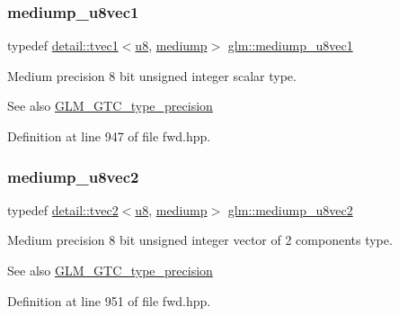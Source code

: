 \subsubsection{\texorpdfstring{mediump\+\_\+u8vec1}{mediump\_u8vec1}}
{\footnotesize\ttfamily typedef \hyperlink{structglm_1_1detail_1_1tvec1}{detail\+::tvec1}$<$\hyperlink{group__gtc__type__precision_ga5e3dc67373d5068997d2d9f41c9024d2}{u8}, \hyperlink{namespaceglm_a0f04f086094c747d227af4425893f545a6416f3ea0c9025fb21ed50c4d6620482}{mediump}$>$ \hyperlink{group__gtc__type__precision_gadefca284b7a5980fb6be735abb77395e}{glm\+::mediump\+\_\+u8vec1}}

Medium precision 8 bit unsigned integer scalar type. \begin{DoxySeeAlso}{See also}
\hyperlink{group__gtc__type__precision}{G\+L\+M\+\_\+\+G\+T\+C\+\_\+type\+\_\+precision} 
\end{DoxySeeAlso}


Definition at line 947 of file fwd.\+hpp.

\mbox{\label{group__gtc__type__precision_ga5e20c1315bc1fecc867bc74525bea2ab}} 
\subsubsection{\texorpdfstring{mediump\+\_\+u8vec2}{mediump\_u8vec2}}
{\footnotesize\ttfamily typedef \hyperlink{structglm_1_1detail_1_1tvec2}{detail\+::tvec2}$<$\hyperlink{group__gtc__type__precision_ga5e3dc67373d5068997d2d9f41c9024d2}{u8}, \hyperlink{namespaceglm_a0f04f086094c747d227af4425893f545a6416f3ea0c9025fb21ed50c4d6620482}{mediump}$>$ \hyperlink{group__gtc__type__precision_ga5e20c1315bc1fecc867bc74525bea2ab}{glm\+::mediump\+\_\+u8vec2}}

Medium precision 8 bit unsigned integer vector of 2 components type. \begin{DoxySeeAlso}{See also}
\hyperlink{group__gtc__type__precision}{G\+L\+M\+\_\+\+G\+T\+C\+\_\+type\+\_\+precision} 
\end{DoxySeeAlso}


Definition at line 951 of file fwd.\+hpp.

\mbox{\label{group__gtc__type__precision_ga58f79eee840b2838443292c50ddb2919}} 
